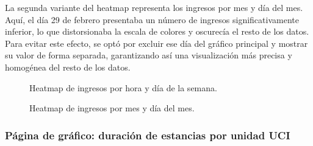 La segunda variante del heatmap representa los ingresos por mes y día del mes. Aquí, el día 29 de febrero presentaba un número de ingresos significativamente inferior, lo que distorsionaba la escala de colores y oscurecía el resto de los datos. Para evitar este efecto, se optó por excluir ese día del gráfico principal y mostrar su valor de forma separada, garantizando así una visualización más precisa y homogénea del resto de los datos.


\begin{figure}[H]
  \centering
  \caption{Heatmap de ingresos por hora y día de la semana.}
  \label{fig:chart-heat-1}
\end{figure}

\begin{figure}[H]
  \centering
  \caption{Heatmap de ingresos por mes y día del mes.}
  \label{fig:chart-heat-2}
\end{figure}


\subsubsection{Página de gráfico: duración de estancias por unidad UCI}

